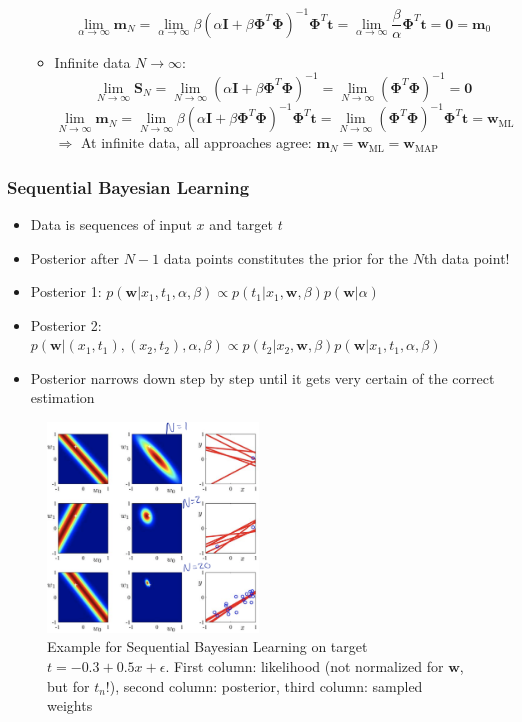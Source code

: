 \begin{itemize}
\begin{itemize}
		$$\lim\limits_{\alpha\to\infty} \bm{m}_N = \lim\limits_{\alpha\to\infty} \beta\left(\alpha\bm{I}+\beta \bm{\Phi}^{T}\bm{\Phi}\right)^{-1}\bm{\Phi}^T \bm{t} = \lim\limits_{\alpha\to\infty} \frac{\beta}{\alpha}\bm{\Phi}^T\bm{t} = \bm{0} = \bm{m}_{0}$$
		\item Infinite data $N\to\infty$:
		$$\lim\limits_{N\to\infty} \bm{S}_N = \lim\limits_{N\to\infty} \left(\alpha\bm{I}+\beta \bm{\Phi}^{T}\bm{\Phi}\right)^{-1} = \lim\limits_{N\to\infty} \left(\bm{\Phi}^{T}\bm{\Phi}\right)^{-1} = \bm{0}$$
		$$\lim\limits_{N\to\infty} \bm{m}_N = \lim\limits_{N\to\infty} \beta\left(\alpha\bm{I}+\beta \bm{\Phi}^{T}\bm{\Phi}\right)^{-1}\bm{\Phi}^T \bm{t} = \lim\limits_{N\to\infty} \left(\bm{\Phi}^T\bm{\Phi}\right)^{-1}\bm{\Phi}^T\bm{t} = \bm{w}_{\text{ML}}$$
		$\Rightarrow$ At infinite data, all approaches agree: $\bm{m}_N = \bm{w}_{\text{ML}} = \bm{w}_{\text{MAP}}$
	\end{itemize}
\end{itemize}

\subsubsection{Sequential Bayesian Learning}
\begin{itemize}
	\item Data is sequences of input $x$ and target $t$
	\item Posterior after $N-1$ data points constitutes the prior for the $N$th data point!
	\item Posterior 1: $p(\bm{w}|x_1,t_1,\alpha,\beta)\propto p(t_1|x_1,\bm{w},\beta)p(\bm{w}|\alpha)$
	\item Posterior 2: $p\left(\bm{w}|(x_1,t_1),(x_2,t_2),\alpha,\beta\right)\propto p(t_2|x_2,\bm{w},\beta)p(\bm{w}|x_1,t_1,\alpha,\beta)$
	\item Posterior narrows down step by step until it gets very certain of the correct estimation 
\end{itemize}
\begin{figure}[ht]
\centering
\includegraphics[width=0.5\textwidth]{figures/sequential_bayesian_linear_regression.png}
\caption{Example for Sequential Bayesian Learning on target $t=-0.3+0.5x+\epsilon$. First column: likelihood (not normalized for $\bm{w}$, but for $t_n$!), second column: posterior, third column: sampled weights}
\end{figure}
